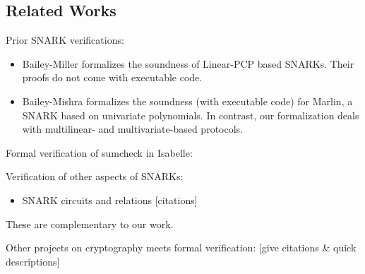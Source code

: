 \iffalse

Potential concerns with the ``verified'' implementation:
\begin{itemize}
    \item Lean automatically uses ``unsafe'' implementations of Array operations, which is equal to the intended operations when the array has size less than the size of the machine word (which is either $32$ or $64$ bits, depending on the architecture).
\end{itemize}

\fi


\subsection{Related Works}\label{sec:related-works}

Prior SNARK verifications:
\begin{itemize}
    \item Bailey-Miller formalizes the soundness of Linear-PCP based SNARKs. Their proofs do not come with executable code.
    \item Bailey-Mishra formalizes the soundness (with executable code) for Marlin, a SNARK based on univariate polynomials. In contrast, our formalization deals with multilinear- and multivariate-based protocols.
\end{itemize}

Formal verification of sumcheck in Isabelle:

Verification of other aspects of SNARKs:
\begin{itemize}
    \item SNARK circuits and relations [citations] 
\end{itemize}
These are complementary to our work.

Other projects on cryptography meets formal verification: [give citations & quick descriptions]